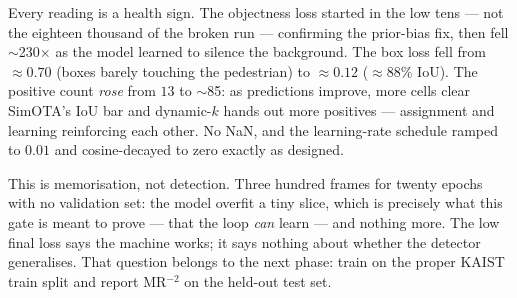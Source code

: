 \documentclass[../main.tex]{subfiles}
\begin{document}
Every reading is a health sign. The objectness loss started in the low tens --- not the eighteen
thousand of the broken run --- confirming the prior-bias fix, then fell $\sim$230$\times$ as the
model learned to silence the background. The box loss fell from $\approx 0.70$ (boxes barely
touching the pedestrian) to $\approx 0.12$ ($\approx$88\% IoU). The positive count \emph{rose} from
$13$ to $\sim$85: as predictions improve, more cells clear SimOTA's IoU bar and dynamic-$k$ hands
out more positives --- assignment and learning reinforcing each other. No NaN, and the learning-rate
schedule ramped to $0.01$ and cosine-decayed to zero exactly as designed.

\begin{lesson}
This is memorisation, not detection. Three hundred frames for twenty epochs with no validation set:
the model overfit a tiny slice, which is precisely what this gate is meant to prove --- that the
loop \emph{can} learn --- and nothing more. The low final loss says the machine works; it says
nothing about whether the detector generalises. That question belongs to the next phase: train on
the proper KAIST train split and report MR$^{-2}$ on the held-out test set.
\end{lesson}
\end{document}
